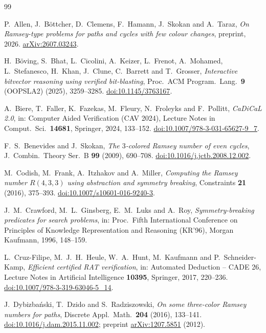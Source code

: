 \begin{thebibliography}{99}

P.~Allen, J.~Böttcher, D.~Clemens, F.~Hamann, J.~Skokan and A.~Taraz,
\emph{On Ramsey-type problems for paths and cycles with few colour changes}, preprint, 2026.
\href{https://arxiv.org/abs/2607.03243}{arXiv:2607.03243}.

H.~Böving, S.~Bhat, L.~Cicolini, A.~Keizer, L.~Frenot, A.~Mohamed,
L.~Stefanesco, H.~Khan, J.~Clune, C.~Barrett and T.~Grosser,
\emph{Interactive bitvector reasoning using verified bit-blasting},
Proc.\ ACM Program.\ Lang.\ \textbf{9} (OOPSLA2) (2025), 3259--3285.
\href{https://doi.org/10.1145/3763167}{doi:10.1145/3763167}.

A.~Biere, T.~Faller, K.~Fazekas, M.~Fleury, N.~Froleyks and F.~Pollitt,
\emph{CaDiCaL 2.0}, in: Computer Aided Verification (CAV 2024), Lecture
Notes in Comput.\ Sci.\ \textbf{14681}, Springer, 2024, 133--152.
\href{https://doi.org/10.1007/978-3-031-65627-9_7}{doi:10.1007/978-3-031-65627-9\_7}.

F.~S.~Benevides and J.~Skokan, \emph{The $3$-colored Ramsey number of even
cycles}, J.~Combin.\ Theory Ser.~B \textbf{99} (2009), 690--708.
\href{https://doi.org/10.1016/j.jctb.2008.12.002}{doi:10.1016/j.jctb.2008.12.002}.

M.~Codish, M.~Frank, A.~Itzhakov and A.~Miller,
\emph{Computing the Ramsey number $R(4,3,3)$ using abstraction and
symmetry breaking}, Constraints \textbf{21} (2016), 375--393.
\href{https://doi.org/10.1007/s10601-016-9240-3}{doi:10.1007/s10601-016-9240-3}.

J.~M.~Crawford, M.~L.~Ginsberg, E.~M.~Luks and A.~Roy,
\emph{Symmetry-breaking predicates for search problems}, in: Proc.\ Fifth
International Conference on Principles of Knowledge Representation and
Reasoning (KR'96), Morgan Kaufmann, 1996, 148--159.

L.~Cruz-Filipe, M.~J.~H.~Heule, W.~A.~Hunt, M.~Kaufmann and
P.~Schneider-Kamp, \emph{Efficient certified RAT verification}, in:
Automated Deduction -- CADE 26, Lecture Notes in Artificial Intelligence
\textbf{10395}, Springer, 2017, 220--236.
\href{https://doi.org/10.1007/978-3-319-63046-5_14}{doi:10.1007/978-3-319-63046-5\_14}.

J.~Dybizbański, T.~Dzido and S.~Radziszowski,
\emph{On some three-color Ramsey numbers for paths}, Discrete Appl.\
Math.\ \textbf{204} (2016), 133--141.
\href{https://doi.org/10.1016/j.dam.2015.11.002}{doi:10.1016/j.dam.2015.11.002};
preprint \href{https://arxiv.org/abs/1207.5851}{arXiv:1207.5851} (2012).


\end{thebibliography}
